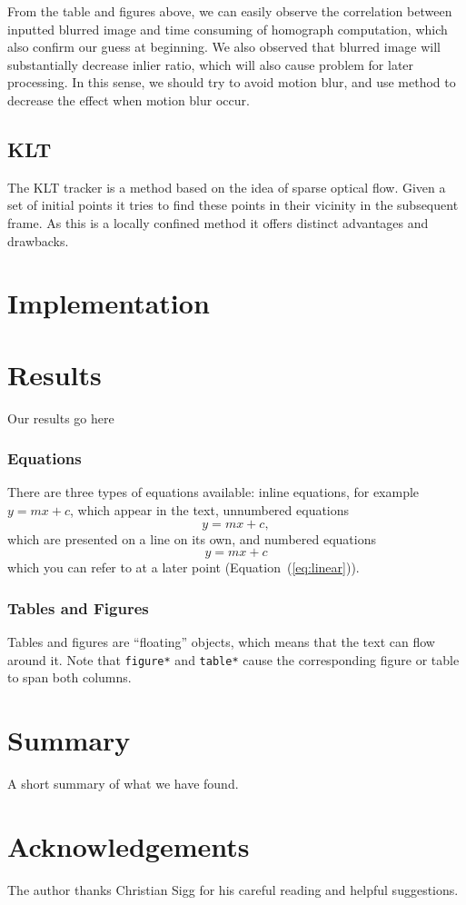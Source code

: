 \documentclass[10pt,conference,compsocconf]{IEEEtran}
\begin{document}
From the table and figures above, we can easily observe the correlation between inputted blurred image and time consuming of homograph computation, which also confirm our guess at beginning. We also observed that blurred image will substantially decrease inlier ratio, which will also cause problem for later processing. In this sense, we should try to avoid motion blur, and use method to decrease the effect when motion blur occur.


\subsection{KLT}

The KLT tracker is a method based on the idea of sparse optical flow. Given a set of initial points it tries to find these points in their vicinity in the subsequent frame. As this is a locally confined method it offers distinct advantages and drawbacks.

\section{Implementation}

\section{Results}

Our results go here


\subsubsection{Equations}

There are three types of equations available: inline equations, for
example $y=mx + c$, which appear in the text, unnumbered equations
$$y=mx + c,$$
which are presented on a line on its own, and numbered equations
\begin{equation}
  \label{eq:linear}
  y = mx + c
\end{equation}
which you can refer to at a later point (Equation~(\ref{eq:linear})).\\

\subsubsection{Tables and Figures}

Tables and figures are ``floating'' objects, which means that the text
can flow around it.
Note
that \texttt{figure*} and \texttt{table*} cause the corresponding
figure or table to span both columns.



\section{Summary}

A short summary of what we have found.

\section*{Acknowledgements}
The author thanks Christian Sigg for his careful reading and helpful
suggestions.



\end{document}
